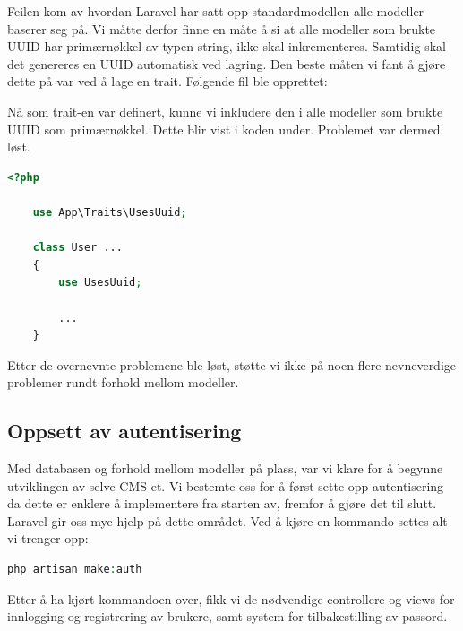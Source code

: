Feilen kom av hvordan Laravel har satt opp standardmodellen alle modeller baserer seg på. Vi måtte derfor finne en måte å si at alle modeller som brukte UUID har primærnøkkel av typen string, ikke skal inkrementeres. Samtidig skal det genereres en UUID automatisk ved lagring. Den beste måten vi fant å gjøre dette på var ved å lage en trait. Følgende fil ble opprettet:


Nå som trait-en var definert, kunne vi inkludere den i alle modeller som brukte UUID som primærnøkkel. Dette blir vist i koden under. Problemet var dermed løst.
\begin{lstlisting}[caption={Bruk av UUID trait i modell}, language=PHP]
    <?php

    use App\Traits\UsesUuid;

    class User ...
    {
        use UsesUuid;

        ...
    }
\end{lstlisting}

Etter de overnevnte problemene ble løst, støtte vi ikke på noen flere nevneverdige problemer rundt forhold mellom modeller.

\subsection{Oppsett av autentisering}
Med databasen og forhold mellom modeller på plass, var vi klare for å begynne utviklingen av selve CMS-et. Vi bestemte oss for å først sette opp autentisering da dette er enklere å implementere fra starten av, fremfor å gjøre det til slutt.
Laravel gir oss mye hjelp på dette området. Ved å kjøre en kommando settes alt vi trenger opp:
\begin{lstlisting}[language=PHP]
    php artisan make:auth
\end{lstlisting}
Etter å ha kjørt kommandoen over, fikk vi de nødvendige controllere og views for innlogging og registrering av brukere, samt system for tilbakestilling av passord.

